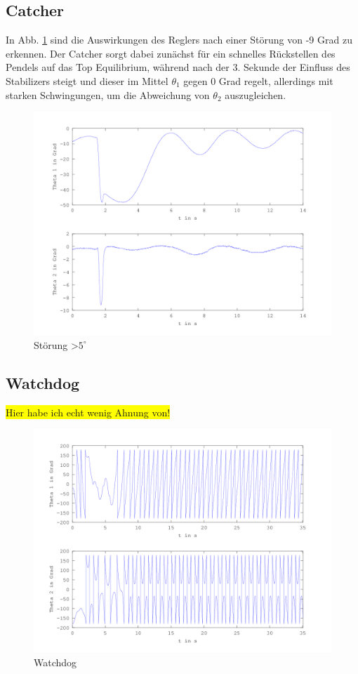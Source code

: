 \subsection{Catcher}
In Abb. \ref{fig.Catcher-Plot} sind die Auswirkungen des Reglers nach einer Störung von -9 Grad zu erkennen. Der Catcher sorgt dabei zunächst für ein schnelles Rückstellen des Pendels auf das Top Equilibrium, während nach der 3. Sekunde der Einfluss des Stabilizers steigt und dieser im Mittel $\theta_1$ gegen 0 Grad regelt, allerdings mit starken Schwingungen, um die Abweichung von $\theta_2$ auszugleichen. 
\begin{figure}[htbp]
	\label{fig.Catcher-Plot}
	\centering
	\includegraphics[width=1.\textwidth]{Grafiken/Catch_kurz.png}
	\caption{Störung \textgreater $5^{\circ}$}
\end{figure}

\subsection{Watchdog}
\colorbox{yellow}{Hier habe ich echt wenig Ahnung von!}
\begin{figure}[htbp]
	\label{fig.Watchdog-Plot}
	\centering
	\includegraphics[width=1.\textwidth]{Grafiken/Watchdog_lang.png}
	\caption{Watchdog}

\end{figure}


